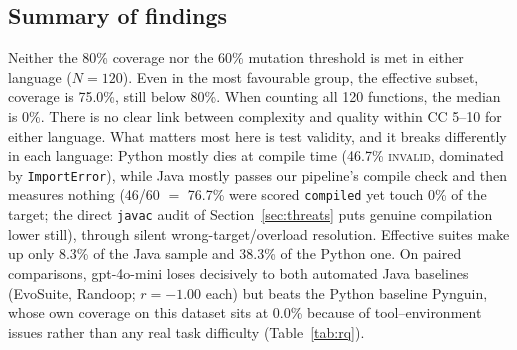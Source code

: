 \subsection{Summary of findings}
Neither the 80\% coverage nor the 60\% mutation threshold is met in either language
($N=120$). Even in the most favourable group, the effective subset, coverage is 75.0\%,
still below 80\%. When counting all 120 functions, the median is 0\%. There is no clear
link between complexity and quality within CC 5--10 for either language. What matters
most here is test validity, and it breaks differently in each language: Python mostly
dies at compile time (46.7\% \textsc{invalid}, dominated by \texttt{ImportError}), while
Java mostly passes our pipeline's compile check and then measures nothing (46/60 $=$ 76.7\%
were scored \texttt{compiled} yet touch 0\% of the target; the direct \texttt{javac} audit
of Section~\ref{sec:threats} puts genuine compilation lower still), through silent
wrong-target/overload resolution. Effective suites make up only 8.3\% of the Java
sample and 38.3\% of the Python one. On paired comparisons, gpt-4o-mini loses decisively to
both automated Java baselines (EvoSuite, Randoop; $r=-1.00$ each) but beats the Python
baseline Pynguin, whose own coverage on this dataset sits at 0.0\% because of
tool--environment issues rather than any real task difficulty (Table~\ref{tab:rq}).
